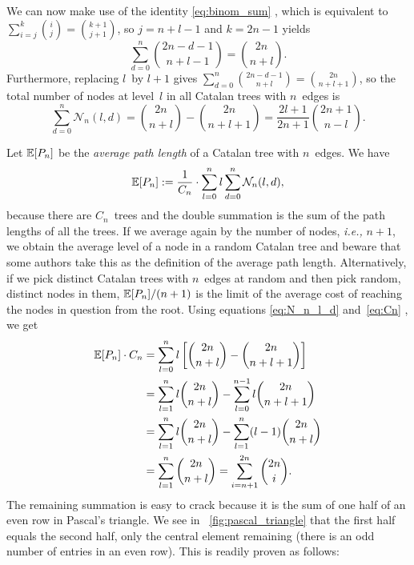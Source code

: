 We can now make use of the identity \eqref{eq:binom_sum}
, which is equivalent to
\(\sum_{i=j}^{k}\binom{i}{j} = \binom{k+1}{j+1}\), so
\(j=n+l-1\) and \(k=2n-1\) yields
\begin{equation*}
\sum_{d=0}^{n}\binom{2n-d-1}{n+l-1} = \binom{2n}{n+l}.
\end{equation*}
Furthermore, replacing \(l\)~by \(l+1\) gives
\(\sum_{d=0}^{n}\binom{2n-d-1}{n+l} = \binom{2n}{n+l+1}\), so the
total number of nodes at level~\(l\) in all Catalan trees with
\(n\)~edges is
\begin{equation}
\sum_{d=0}^{n}\mathcal{N}_n(l,d)
 = \binom{2n}{n+l} - \binom{2n}{n+l+1}
 = \frac{2l+1}{2n+1}\binom{2n+1}{n-l}.
\label{eq:N_n_l_d}
\end{equation}

Let \(\mathbb{E}[{P_n}]\) be the \emph{average path length} of a Catalan
tree with \(n\)~edges. We have
\begin{equation*}
  \mathbb{E}[{P_n}] := \frac{1}{C_{n}} \cdot \sum_{l=0}^{n}l\sum_{d=0}^{n}\mathcal{N}_n(l,d),
\end{equation*}
because there are \(C_n\)~trees and the double summation is the sum of
the path lengths of all the trees. If we average again by the number
of nodes, \emph{i.e.,} \(n+1\), we obtain the average level of a node
in a random Catalan tree and beware that some authors take this as the
definition of the average path length. Alternatively, if we pick
distinct Catalan trees with \(n\)~edges at random and then pick
random, distinct nodes in them, \(\mathbb{E}[{P_n}]/(n+1)\) is the limit
of the average cost of reaching the nodes in question from the
root. Using equations \eqref{eq:N_n_l_d} and~\eqref{eq:Cn}
, we get
\begin{align*}
\mathbb{E}[{P_n}] \cdot C_n
 &= \sum_{l=0}^{n}l\left[\binom{2n}{n+l} - \binom{2n}{n+l+1}\right]\\
 &= \sum_{l=1}^{n}l \binom{2n}{n+l} - \sum_{l=0}^{n-1}l \binom{2n}{n+l+1}\\
 &= \sum_{l=1}^{n}l \binom{2n}{n+l} - \sum_{l=1}^{n}(l-1)\binom{2n}{n+l}\\
 &= \sum_{l=1}^{n}\binom{2n}{n+l}
  = \sum_{i=n+1}^{2n}\binom{2n}{i}.
\end{align*}
The remaining summation is easy to crack because it is the sum of one
half of an even row in Pascal's triangle. We see in
\fig~\vref{fig:pascal_triangle} that the first half equals the second
half, only the central element remaining (there is an odd number of
entries in an even row). This is readily proven as follows:

